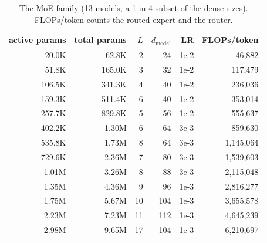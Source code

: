 \documentclass[10pt]{article}
\begin{document}
\begin{table}[h]
\centering
\footnotesize
\begin{tabular}{rrrrrr}
\toprule
active params & total params & $L$ & $d_{\mathrm{model}}$ & LR & FLOPs/token \\
\midrule
20.0K & 62.8K & 2 & 24 & 1e-2 & 46{,}882 \\
51.8K & 165.0K & 3 & 32 & 1e-2 & 117{,}479 \\
106.5K & 341.3K & 4 & 40 & 1e-2 & 236{,}036 \\
159.3K & 511.4K & 6 & 40 & 1e-2 & 353{,}014 \\
257.7K & 829.8K & 5 & 56 & 1e-2 & 555{,}637 \\
402.2K & 1.30M & 6 & 64 & 3e-3 & 859{,}630 \\
535.8K & 1.73M & 8 & 64 & 3e-3 & 1{,}145{,}064 \\
729.6K & 2.36M & 7 & 80 & 3e-3 & 1{,}539{,}603 \\
1.01M & 3.26M & 8 & 88 & 3e-3 & 2{,}115{,}048 \\
1.35M & 4.36M & 9 & 96 & 1e-3 & 2{,}816{,}277 \\
1.75M & 5.67M & 10 & 104 & 1e-3 & 3{,}655{,}578 \\
2.23M & 7.23M & 11 & 112 & 1e-3 & 4{,}645{,}239 \\
2.98M & 9.65M & 17 & 104 & 1e-3 & 6{,}210{,}697 \\
\bottomrule
\end{tabular}
\caption{The MoE family (13 models, a 1-in-4 subset of the dense sizes).
FLOPs/token counts the routed expert and the router.}
\label{tab:zoo-moe}
\end{table}
\end{document}

